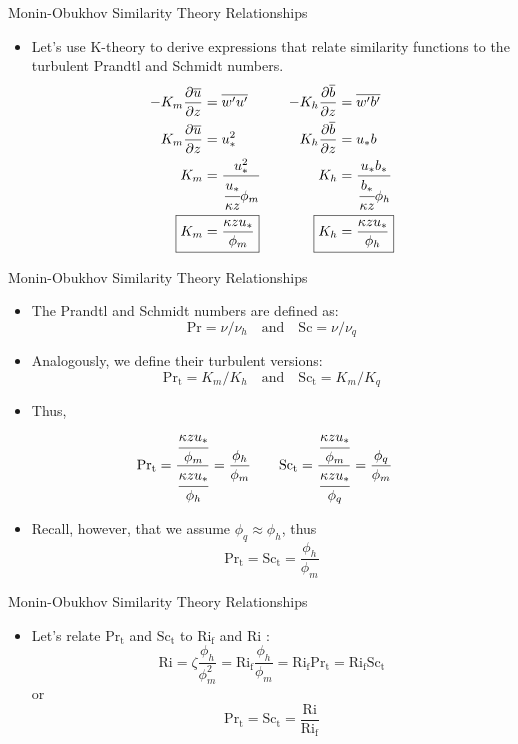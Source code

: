 \begin{frame}{Monin-Obukhov Similarity Theory Relationships}

\begin{itemize}
	\item Let's use K-theory to derive expressions that relate similarity functions to the turbulent Prandtl and Schmidt numbers.
	\begin{align*}
		-K_m\frac{\partial \overline{u}}{\partial z} &= \overline{w^\prime u^\prime} &\quad  -K_h\frac{\partial \overline{b}}{\partial z} &= \overline{w^\prime b^\prime}\\
		K_m\frac{\partial \overline{u}}{\partial z} &= u_*^2 &\quad  K_h\frac{\partial \overline{b}}{\partial z} &= u_*b\\
		K_m &= \frac{u_*^2}{\cfrac{u_*}{\kappa z}\phi_m} &\quad K_h &= \frac{u_*b_*}{\cfrac{b_*}{\kappa z}\phi_h}\\
		\Aboxed{K_m &= \frac{\kappa z u_*}{\phi_m}} &\quad \Aboxed{K_h &= \frac{\kappa z u_*}{\phi_h}}
	\end{align*}
\end{itemize}
\end{frame}
\begin{frame}{Monin-Obukhov Similarity Theory Relationships}

\begin{itemize}
	\item The Prandtl and Schmidt numbers are defined as:
	$$\mathrm{Pr} = \nu/\nu_h \quad \text{and} \quad \mathrm{Sc} = \nu/\nu_q$$
	\item Analogously, we define their turbulent versions:
	$$\mathrm{Pr_t} = K_m/K_h \quad \text{and} \quad \mathrm{Sc_t} = K_m/K_q$$
	\item Thus,
	\begin{align*}
	\mathrm{Pr_t} = \frac{\cfrac{\kappa z u_*}{\phi_m}}{\cfrac{\kappa z u_*}{\phi_h}} = \frac{\phi_h}{\phi_m} &\qquad \mathrm{Sc_t} = \frac{\cfrac{\kappa z u_*}{\phi_m}}{\cfrac{\kappa z u_*}{\phi_q}} = \frac{\phi_q}{\phi_m}
	\end{align*}
	\item Recall, however, that we assume $\phi_q \approx \phi_h$, thus
	$$\boxed{\mathrm{Pr_t} = \mathrm{Sc_t} = \frac{\phi_h}{\phi_m}}$$
\end{itemize}
\end{frame}
\begin{frame}{Monin-Obukhov Similarity Theory Relationships}

\begin{itemize}
	\item Let's relate $\mathrm{Pr_t}$ and $\mathrm{Sc_t}$ to $\mathrm{Ri_f}$ and $\mathrm{Ri}$ :
	$$\mathrm{Ri} = \zeta \frac{\phi_h}{\phi_m^2} = \mathrm{Ri_f}\frac{\phi_h}{\phi_m}=\mathrm{Ri_f}\mathrm{Pr_t}=\mathrm{Ri_f}\mathrm{Sc_t}$$
	or
	$$\boxed{\mathrm{Pr_t} = \mathrm{Sc_t} = \frac{\mathrm{Ri}}{\mathrm{Ri_f}}}$$
\end{itemize}
\end{frame}
